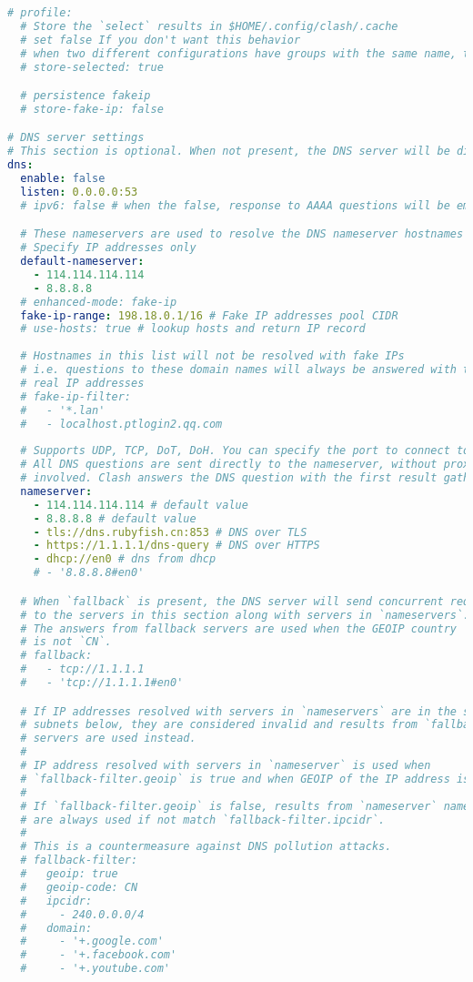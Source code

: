 \documentclass{ctexart}
\begin{document}
\begin{lstlisting}[breaklines=true,language=yaml,style=yaml]
# profile:
  # Store the `select` results in $HOME/.config/clash/.cache
  # set false If you don't want this behavior
  # when two different configurations have groups with the same name, the selected values are shared
  # store-selected: true

  # persistence fakeip
  # store-fake-ip: false

# DNS server settings
# This section is optional. When not present, the DNS server will be disabled.
dns:
  enable: false
  listen: 0.0.0.0:53
  # ipv6: false # when the false, response to AAAA questions will be empty

  # These nameservers are used to resolve the DNS nameserver hostnames below.
  # Specify IP addresses only
  default-nameserver:
    - 114.114.114.114
    - 8.8.8.8
  # enhanced-mode: fake-ip
  fake-ip-range: 198.18.0.1/16 # Fake IP addresses pool CIDR
  # use-hosts: true # lookup hosts and return IP record
  
  # Hostnames in this list will not be resolved with fake IPs
  # i.e. questions to these domain names will always be answered with their
  # real IP addresses
  # fake-ip-filter:
  #   - '*.lan'
  #   - localhost.ptlogin2.qq.com
  
  # Supports UDP, TCP, DoT, DoH. You can specify the port to connect to.
  # All DNS questions are sent directly to the nameserver, without proxies
  # involved. Clash answers the DNS question with the first result gathered.
  nameserver:
    - 114.114.114.114 # default value
    - 8.8.8.8 # default value
    - tls://dns.rubyfish.cn:853 # DNS over TLS
    - https://1.1.1.1/dns-query # DNS over HTTPS
    - dhcp://en0 # dns from dhcp
    # - '8.8.8.8#en0'

  # When `fallback` is present, the DNS server will send concurrent requests
  # to the servers in this section along with servers in `nameservers`.
  # The answers from fallback servers are used when the GEOIP country
  # is not `CN`.
  # fallback:
  #   - tcp://1.1.1.1
  #   - 'tcp://1.1.1.1#en0'

  # If IP addresses resolved with servers in `nameservers` are in the specified
  # subnets below, they are considered invalid and results from `fallback`
  # servers are used instead.
  #
  # IP address resolved with servers in `nameserver` is used when
  # `fallback-filter.geoip` is true and when GEOIP of the IP address is `CN`.
  #
  # If `fallback-filter.geoip` is false, results from `nameserver` nameservers
  # are always used if not match `fallback-filter.ipcidr`.
  #
  # This is a countermeasure against DNS pollution attacks.
  # fallback-filter:
  #   geoip: true
  #   geoip-code: CN
  #   ipcidr:
  #     - 240.0.0.0/4
  #   domain:
  #     - '+.google.com'
  #     - '+.facebook.com'
  #     - '+.youtube.com'
  

\end{lstlisting}
\end{document}
